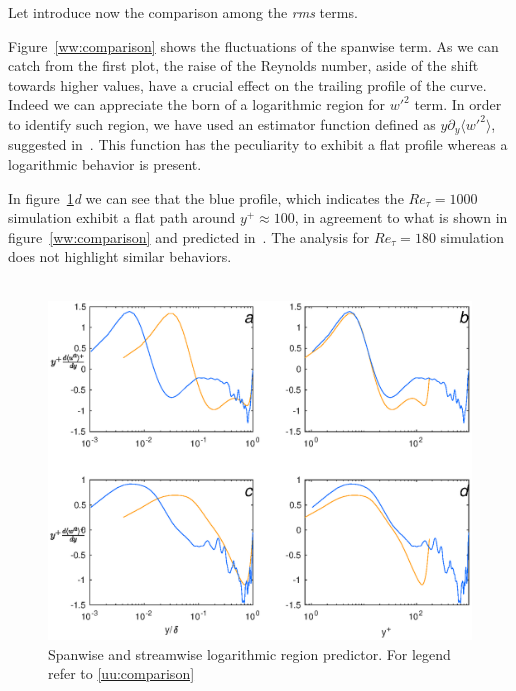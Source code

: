 Let introduce now the comparison among the \emph{rms} terms. \par
Figure~\ref{ww:comparison} shows the fluctuations of the spanwise term. As we can catch from the first plot, the raise of the Reynolds number, aside of the shift towards higher values, have a crucial effect on the trailing profile of the curve. Indeed we can appreciate the born of a logarithmic region for $w'^{2}$ term. In order to identify such region, we have used an estimator function defined as $y\partial_{y}\langle w'^{2} \rangle$, suggested in~\cite{Lee}. This function has the peculiarity to exhibit a flat profile whereas a logarithmic behavior is present.\par

In figure~\ref{d2:rms}\emph{d} we can see that the blue profile, which indicates the $Re_{\tau}=1000$ simulation exhibit a flat path around $y^{+}\approx100$, in agreement to what is shown in figure~\ref{ww:comparison} and predicted in~\cite{Lee}.
The analysis for $Re_{\tau}=180$ simulation does not highlight similar behaviors.\\~\par

\begin{figure}
\begin{center}
\includegraphics[scale=0.55]{grafici/d2rms.eps}
\caption{Spanwise and streamwise logarithmic region predictor. For legend refer to \ref{uu:comparison}}
\label{d2:rms}
\end{center}
\end{figure}

